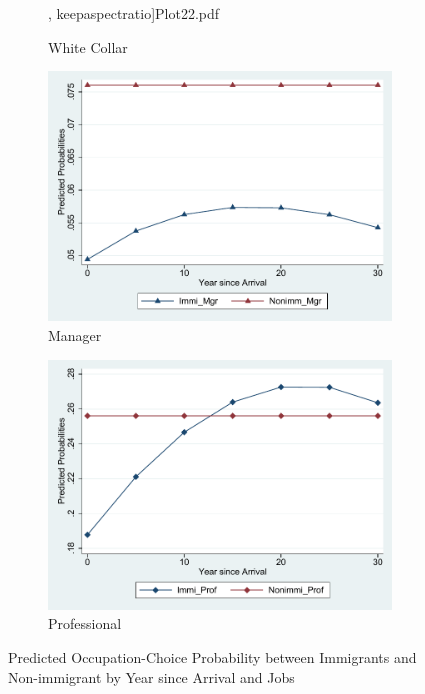 \begin{figure}[H]
\begin{subfigure}[t]{.45\textwidth}
    , keepaspectratio]{Plot22.pdf}
    \caption{White Collar}
  \end{subfigure}
  \begin{subfigure}[t]{.45\textwidth}
    \includegraphics[width=\linewidth
    , keepaspectratio]{Plot23.pdf}
    \caption{Manager}
  \end{subfigure}
  \begin{subfigure}[t]{.45\textwidth}
    \includegraphics[width=\linewidth
    , keepaspectratio]{Plot24.pdf}
    \caption{Professional}
  \end{subfigure}
  \caption{Predicted Occupation-Choice Probability between Immigrants and Non-immigrant by Year since Arrival and Jobs}
  \label{fig:mlogit}
\end{figure}

